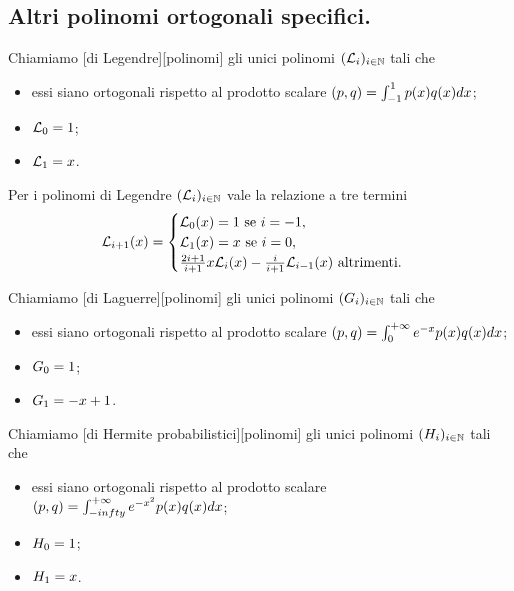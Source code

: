 \subsection{Altri polinomi ortogonali specifici.}
\label{IstituzioniDiAnalisiNumerici_AltriPolinomiOrtogonalSpecifici}
\begin{Definition}
	Chiamiamo [di Legendre][polinomi] gli unici polinomi $(\mathcal{L}_i)_{i \in \mathbb{N}}$ tali che
	\begin{itemize}
		\item essi siano ortogonali rispetto al prodotto scalare $\left ( p , q \right ) = \int_{-1}^1 p(x)q(x)dx$;
		\item $\mathcal{L}_0 = 1$;
		\item $\mathcal{L}_1 = x$.
	\end{itemize}
\end{Definition}
\begin{Theorem}
	Per i polinomi di Legendre $(\mathcal{L}_i)_{i \in \mathbb{N}}$ vale la relazione a tre termini
	\[
		\mathcal{L}_{i + 1}(x) = 
		\begin{cases}
			\mathcal{L}_0(x) = 1\text{ se }i = -1,\\
			\mathcal{L}_1(x) = x\text{ se }i = 0,\\
			\frac{2i + 1}{i + 1} x \mathcal{L}_i(x) - \frac{i}{i + 1}\mathcal{L}_{i - 1}(x)\text{ altrimenti}.
		\end{cases}
	\]
\end{Theorem}
\begin{Definition}
	Chiamiamo [di Laguerre][polinomi] gli unici polinomi $(G_i)_{i \in \mathbb{N}}$ tali che
	\begin{itemize}
		\item essi siano ortogonali rispetto al prodotto scalare $\left ( p , q \right ) = \int_0^{+ \infty} e^{-x} p(x)q(x)dx$;
		\item $G_0 = 1$;
		\item $G_1 = - x + 1$.
	\end{itemize}
\end{Definition}
\begin{Definition}
	Chiamiamo [di Hermite probabilistici][polinomi] gli unici polinomi $(H_i)_{i \in \mathbb{N}}$ tali che
	\begin{itemize}
		\item essi siano ortogonali rispetto al prodotto scalare $\left ( p , q \right ) = \int_{-infty}^{+\infty} e^{-x^2} p(x)q(x)dx$;
		\item $H_0 = 1$;
		\item $H_1 = x$.
	\end{itemize}
\end{Definition}
